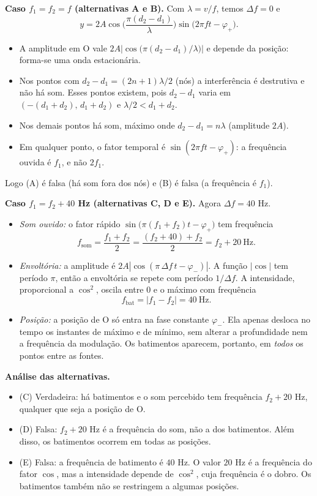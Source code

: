 \documentclass{article}%
\begin{document}
\textbf{Caso $f_1=f_2=f$ (alternativas A e B).} Com $\lambda=v/f$, temos $\Delta f=0$ e
\[
y=2A\cos\!\Big(\frac{\pi(d_2-d_1)}{\lambda}\Big)\sin\!\Big(2\pi f t-\varphi_+\Big).
\]
\begin{itemize}
\item A amplitude em O vale $2A\left|\cos\!\big(\pi(d_2-d_1)/\lambda\big)\right|$ e depende da posição: forma-se uma onda estacionária.
\item Nos pontos com $d_2-d_1=(2n+1)\lambda/2$ (nós) a interferência é destrutiva e não há som. Esses pontos existem, pois $d_2-d_1$ varia em $(-(d_1+d_2),\,d_1+d_2)$ e $\lambda/2<d_1+d_2$.
\item Nos demais pontos há som, máximo onde $d_2-d_1=n\lambda$ (amplitude $2A$).
\item Em qualquer ponto, o fator temporal é $\sin(2\pi f t-\varphi_+)$: a frequência ouvida é $f_1$, e não $2f_1$.
\end{itemize}
Logo (A) é falsa (há som fora dos nós) e (B) é falsa (a frequência é $f_1$).

\textbf{Caso $f_1=f_2+40$ Hz (alternativas C, D e E).} Agora $\Delta f=40$ Hz.
\begin{itemize}
\item \emph{Som ouvido:} o fator rápido $\sin\!\big(\pi(f_1+f_2)t-\varphi_+\big)$ tem frequência
\[
f_{\text{som}}=\frac{f_1+f_2}{2}=\frac{(f_2+40)+f_2}{2}=f_2+20\ \text{Hz}.
\]
\item \emph{Envoltória:} a amplitude é $2A\left|\cos(\pi\,\Delta f\,t-\varphi_-)\right|$. A função $|\cos|$ tem período $\pi$, então a envoltória se repete com período $1/\Delta f$. A intensidade, proporcional a $\cos^2$, oscila entre $0$ e o máximo com frequência
\[
f_{\text{bat}}=|f_1-f_2|=40\ \text{Hz}.
\]
\item \emph{Posição:} a posição de O só entra na fase constante $\varphi_-$. Ela apenas desloca no tempo os instantes de máximo e de mínimo, sem alterar a profundidade nem a frequência da modulação. Os batimentos aparecem, portanto, em \emph{todos} os pontos entre as fontes.
\end{itemize}

\textbf{Análise das alternativas.}
\begin{itemize}
\item (C) Verdadeira: há batimentos e o som percebido tem frequência $f_2+20$ Hz, qualquer que seja a posição de O.
\item (D) Falsa: $f_2+20$ Hz é a frequência do som, não a dos batimentos. Além disso, os batimentos ocorrem em todas as posições.
\item (E) Falsa: a frequência de batimento é $40$ Hz. O valor $20$ Hz é a frequência do fator $\cos$, mas a intensidade depende de $\cos^2$, cuja frequência é o dobro. Os batimentos também não se restringem a algumas posições.
\end{itemize}
\end{document}
